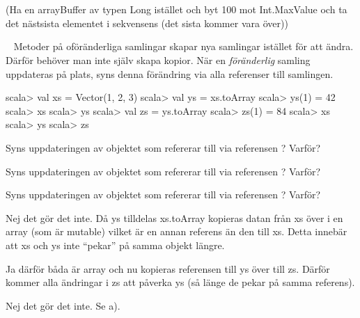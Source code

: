 \SubtaskSolved  {}\\
\\
(Ha en arrayBuffer av typen Long istället och byt 100 mot Int.MaxValue och ta det nästsista elementet i sekvensens (det sista kommer vara över))


\QUESTEND









\QUESTBEGIN

\Task  \what~  Metoder på oföränderliga samlingar skapar nya samlingar istället för att ändra. Därför behöver man inte själv skapa kopior. När en \emph{föränderlig} samling uppdateras på plats, syns denna förändring via alla referenser till samlingen.

\begin{REPL}
scala> val xs = Vector(1, 2, 3)
scala> val ys = xs.toArray
scala> ys(1) = 42
scala> xs
scala> ys
scala> val zs = ys.toArray
scala> zs(1) = 84
scala> xs
scala> ys
scala> zs
\end{REPL}

\Subtask Syns uppdateringen av objektet som  refererar till via referensen ? Varför?

\Subtask Syns uppdateringen av objektet som  refererar till via referensen ? Varför?

\Subtask Syns uppdateringen av objektet som  refererar till via referensen ? Varför?

\SOLUTION


\TaskSolved \what


\SubtaskSolved  Nej det gör det inte.
Då ys tilldelas xs.toArray kopieras datan från xs över i en array (som är mutable) vilket är en annan referens än den till xs.
Detta innebär att xs och ys inte “pekar” på samma objekt längre.

\SubtaskSolved  Ja därför båda är array och nu kopieras referensen till ys över till zs.
Därför kommer alla ändringar i zs att påverka ys (så länge de pekar på samma referens).

\SubtaskSolved  Nej det gör det inte. Se a).



\QUESTEND








